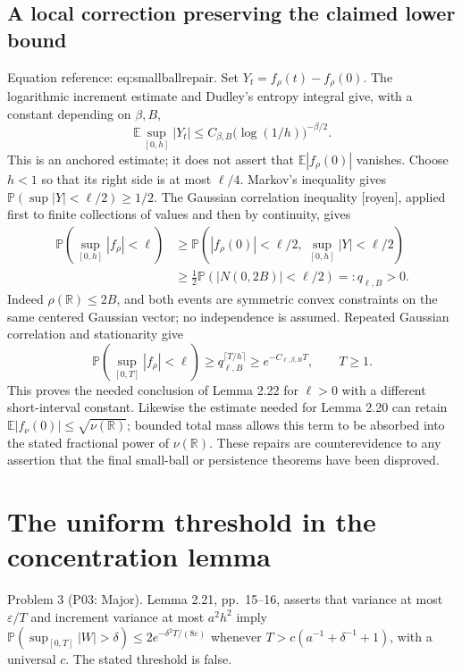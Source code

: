 \documentclass[10pt]{article}
\begin{document}
\subsection*{A local correction preserving the claimed lower bound}
Equation reference: eq:smallballrepair. Set \(Y_t=f_\rho(t)-f_\rho(0)\). The logarithmic increment estimate and Dudley’s entropy integral give, with a constant depending on \(\beta,B\), \[\mathbb E\sup_{[0,h]}|Y_t|\le C_{\beta,B}
       \bigl(\log(1/h)\bigr)^{-\beta/2}.\] This is an anchored estimate; it does not assert that \(\mathbb E|f_\rho(0)|\) vanishes. Choose \(h<1\) so that its right side is at most \(\ell/4\). Markov’s inequality gives \(\mathbb P(\sup|Y|<\ell/2)\ge1/2\). The Gaussian correlation inequality [royen], applied first to finite collections of values and then by continuity, gives \[\begin{aligned}
 \mathbb P(\sup_{[0,h]}|f_\rho|<\ell)
 &\ge \mathbb P(|f_\rho(0)|<\ell/2,\ \sup_{[0,h]}|Y|<\ell/2)\\
 &\ge \tfrac12\mathbb P(|N(0,2B)|<\ell/2)=:q_{\ell,B}>0 .
 \end{aligned}\] Indeed \(\rho(\mathbb R)\le2B\), and both events are symmetric convex constraints on the same centered Gaussian vector; no independence is assumed. Repeated Gaussian correlation and stationarity give \[\mathbb P(\sup_{[0,T]}|f_\rho|<\ell)\ge q_{\ell,B}^{\lceil T/h\rceil}
       \ge e^{-C_{\ell,\beta,B}T},\qquad T\ge1 .\] This proves the needed conclusion of Lemma 2.22 for \(\ell>0\) with a different short-interval constant. Likewise the estimate needed for Lemma 2.20 can retain \(\mathbb E|f_\nu(0)|\le\sqrt{\nu(\mathbb R)}\); bounded total mass allows this term to be absorbed into the stated fractional power of \(\nu(\mathbb R)\). These repairs are counterevidence to any assertion that the final small-ball or persistence theorems have been disproved.\par
\section*{The uniform threshold in the concentration lemma}
Problem 3 (P03: Major).  Lemma 2.21, pp. 15–16, asserts that variance at most \(\varepsilon/T\) and increment variance at most \(a^2h^2\) imply \(\mathbb P(\sup_{[0,T]}|W|>\delta)\le2e^{-\delta^2T/(8\varepsilon)}\) whenever \(T>c(a^{-1}+\delta^{-1}+1)\), with a universal \(c\). The stated threshold is false.\par
\end{document}
